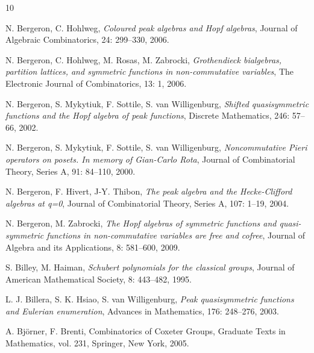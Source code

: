 \documentclass[11pt]{amsart}
\numberwithin{equation}{section}
\begin{document}
\begin{thebibliography}{10}

 N. Bergeron, C. Hohlweg, 
\newblock \textit{Coloured peak algebras and Hopf algebras},
\newblock Journal of Algebraic Combinatorics, 24: 299--330, 2006.

 N. Bergeron, C. Hohlweg, M. Rosas, M. Zabrocki,
\newblock \textit{Grothendieck bialgebras, partition lattices, and symmetric functions in non-commutative variables},
\newblock The Electronic Journal of Combinatorics, 13: 1, 2006.

 N. Bergeron, S. Mykytiuk, F. Sottile, S. van Willigenburg,
\newblock \textit{Shifted quasisymmetric functions and the Hopf algebra of peak functions},
\newblock Discrete Mathematics, 246: 57--66, 2002.

 N. Bergeron, S. Mykytiuk, F. Sottile, S. van Willigenburg,
 \newblock \textit{Noncommutative Pieri operators on posets. In memory of Gian-Carlo Rota}, Journal of Combinatorial Theory, Series A, 91:  84--110, 2000.

 N. Bergeron, F. Hivert, J-Y. Thibon,
\newblock \textit{The peak algebra and the Hecke-Clifford algebras at q=0},
\newblock Journal of Combinatorial Theory, Series A, 107: 1--19, 2004.

 N. Bergeron, M. Zabrocki, 
\newblock \textit{The Hopf algebras of symmetric functions and quasi-symmetric functions in non-commutative variables are free and cofree},
\newblock Journal of Algebra and its Applications, 8: 581--600, 2009.

  S. Billey, M. Haiman, \textit{Schubert polynomials for the classical groups}, Journal of American Mathematical Society, 8: 443–482, 1995.

 L. J. Billera, S. K. Hsiao, S. van Willigenburg, 
\newblock \textit{Peak quasisymmetric functions and Eulerian enumeration},
\newblock Advances in Mathematics, 176: 248--276, 2003.



 A. Björner, F. Brenti, Combinatorics of Coxeter Groups, Graduate Texts in Mathematics, vol. 231, Springer,
New York, 2005.






\end{thebibliography}
\end{document}
